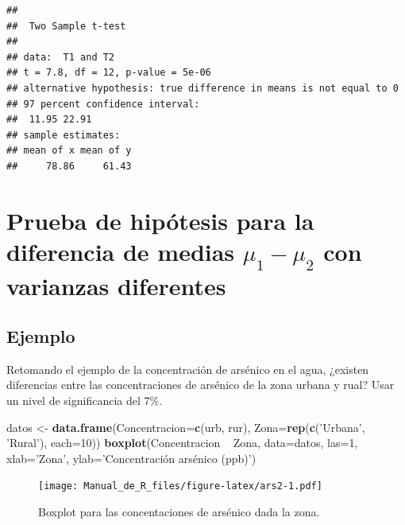 \documentclass[10pt,]{krantz}
\makeatletter
\newenvironment{Shaded}{\begin{snugshade}}{\end{snugshade}}
\newcommand{\KeywordTok}[1]{\textcolor[rgb]{0.13,0.29,0.53}{\textbf{{#1}}}}
\newcommand{\DataTypeTok}[1]{\textcolor[rgb]{0.13,0.29,0.53}{{#1}}}
\newcommand{\DecValTok}[1]{\textcolor[rgb]{0.00,0.00,0.81}{{#1}}}
\newcommand{\StringTok}[1]{\textcolor[rgb]{0.31,0.60,0.02}{{#1}}}
\newcommand{\NormalTok}[1]{{#1}}
\newenvironment{kframe}{%
\medskip{}
\setlength{\fboxsep}{.8em}
 \def\at@end@of@kframe{}%
 \ifinner\ifhmode%
  \def\at@end@of@kframe{\end{minipage}}%
  \begin{minipage}{\columnwidth}%
 \fi\fi%
 \def\FrameCommand##1{\hskip\@totalleftmargin \hskip-\fboxsep
 \colorbox{shadecolor}{##1}\hskip-\fboxsep
     \hskip-\linewidth \hskip-\@totalleftmargin \hskip\columnwidth}%
 \MakeFramed {\advance\hsize-\width
   \@totalleftmargin\z@ \linewidth\hsize
   \@setminipage}}%
 {\par\unskip\endMakeFramed%
 \at@end@of@kframe}
\renewenvironment{Shaded}{\begin{kframe}}{\end{kframe}}
\makeatother
\begin{document}
\begin{verbatim}
## 
##  Two Sample t-test
## 
## data:  T1 and T2
## t = 7.8, df = 12, p-value = 5e-06
## alternative hypothesis: true difference in means is not equal to 0
## 97 percent confidence interval:
##  11.95 22.91
## sample estimates:
## mean of x mean of y 
##     78.86     61.43
\end{verbatim}

\section{\texorpdfstring{Prueba de hipótesis para la diferencia de
medias \(\mu_1-\mu_2\) con varianzas
diferentes}{Prueba de hipótesis para la diferencia de medias \textbackslash{}mu\_1-\textbackslash{}mu\_2 con varianzas diferentes}}\label{prueba-de-hipotesis-para-la-diferencia-de-medias-mu_1-mu_2-con-varianzas-diferentes}

\subsection*{Ejemplo}\label{ejemplo-68}


Retomando el ejemplo de la concentración de arsénico en el agua,
¿existen diferencias entre las concentraciones de arsénico de la zona
urbana y rual? Usar un nivel de significancia del 7\%.

\begin{Shaded}
\begin{Highlighting}[]
\NormalTok{datos <-}\StringTok{ }\KeywordTok{data.frame}\NormalTok{(}\DataTypeTok{Concentracion=}\KeywordTok{c}\NormalTok{(urb, rur),}
                    \DataTypeTok{Zona=}\KeywordTok{rep}\NormalTok{(}\KeywordTok{c}\NormalTok{(}\StringTok{'Urbana'}\NormalTok{, }\StringTok{'Rural'}\NormalTok{), }\DataTypeTok{each=}\DecValTok{10}\NormalTok{))}
\KeywordTok{boxplot}\NormalTok{(Concentracion ~}\StringTok{ }\NormalTok{Zona, }\DataTypeTok{data=}\NormalTok{datos, }\DataTypeTok{las=}\DecValTok{1}\NormalTok{,}
        \DataTypeTok{xlab=}\StringTok{'Zona'}\NormalTok{, }\DataTypeTok{ylab=}\StringTok{'Concentración arsénico (ppb)'}\NormalTok{)}
\end{Highlighting}
\end{Shaded}

\begin{figure}[htbp]
\centering
\texttt{[image: Manual\_de\_R\_files/figure-latex/ars2-1.pdf]}
\caption{\label{fig:ars2}Boxplot para las concentaciones de arsénico dada la
zona.}
\end{figure}
\end{document}
